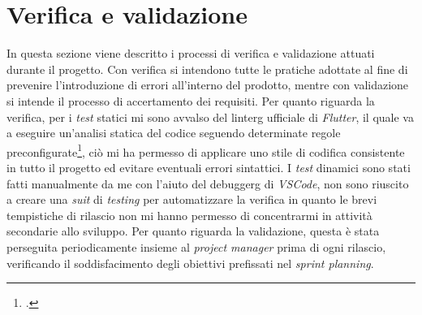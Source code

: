 \section{Verifica e validazione}
In questa sezione viene descritto i processi di verifica e validazione attuati durante il progetto. Con verifica si intendono tutte le pratiche adottate al fine di prevenire l'introduzione di errori all'interno del prodotto, mentre con validazione si intende il processo di accertamento dei requisiti. Per quanto riguarda la verifica, per i \textit{test} statici mi sono avvalso del \gls{linterg} ufficiale di \textit{Flutter}, il quale va a eseguire un'analisi statica del codice seguendo determinate regole preconfigurate\footcite{site:linter-doc}, ciò mi ha permesso di applicare uno stile di codifica consistente in tutto il progetto ed evitare eventuali errori sintattici. I \textit{test} dinamici sono stati fatti manualmente da me con l'aiuto del \gls{debuggerg} di \textit{VSCode}, non sono riuscito a creare una \textit{suit} di \textit{testing} per automatizzare la verifica in quanto le brevi tempistiche di rilascio non mi hanno permesso di concentrarmi in attività secondarie allo sviluppo.
Per quanto riguarda la validazione, questa è stata perseguita periodicamente insieme al \textit{project manager} prima di ogni rilascio, verificando il soddisfacimento degli obiettivi prefissati nel \textit{sprint planning}. 
